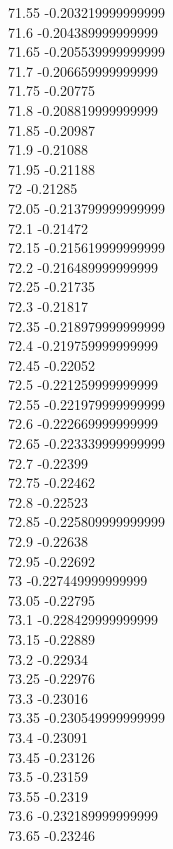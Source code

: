 {71.55	-0.203219999999999\\
71.6	-0.204389999999999\\
71.65	-0.205539999999999\\
71.7	-0.206659999999999\\
71.75	-0.20775\\
71.8	-0.208819999999999\\
71.85	-0.20987\\
71.9	-0.21088\\
71.95	-0.21188\\
72	-0.21285\\
72.05	-0.213799999999999\\
72.1	-0.21472\\
72.15	-0.215619999999999\\
72.2	-0.216489999999999\\
72.25	-0.21735\\
72.3	-0.21817\\
72.35	-0.218979999999999\\
72.4	-0.219759999999999\\
72.45	-0.22052\\
72.5	-0.221259999999999\\
72.55	-0.221979999999999\\
72.6	-0.222669999999999\\
72.65	-0.223339999999999\\
72.7	-0.22399\\
72.75	-0.22462\\
72.8	-0.22523\\
72.85	-0.225809999999999\\
72.9	-0.22638\\
72.95	-0.22692\\
73	-0.227449999999999\\
73.05	-0.22795\\
73.1	-0.228429999999999\\
73.15	-0.22889\\
73.2	-0.22934\\
73.25	-0.22976\\
73.3	-0.23016\\
73.35	-0.230549999999999\\
73.4	-0.23091\\
73.45	-0.23126\\
73.5	-0.23159\\
73.55	-0.2319\\
73.6	-0.232189999999999\\
73.65	-0.23246\\
}
